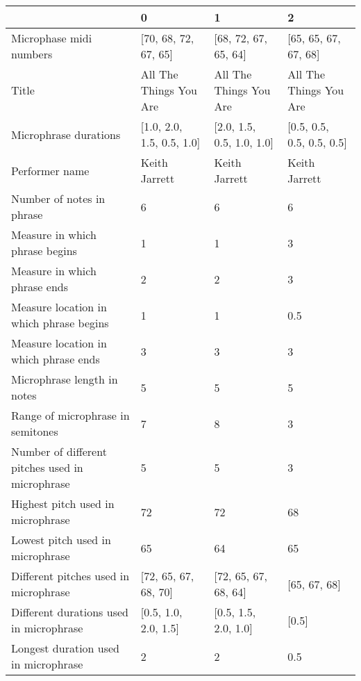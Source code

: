 \documentclass[11pt]{article}
\begin{document}
    \begin{tabular}{llll}
\toprule
{} &                                    0 &                                    1 &                                    2 \\
\midrule
Microphase midi numbers                                            &  [70, 68, 72, 67, 65] &  [68, 72, 67, 65, 64] &  [65, 65, 67, 67, 68] \\
Title                                                              &  All The Things You Are &  All The Things You Are &  All The Things You Are \\
Microphrase durations                                              &  [1.0, 2.0, 1.5, 0.5, 1.0] &  [2.0, 1.5, 0.5, 1.0, 1.0] &  [0.5, 0.5, 0.5, 0.5, 0.5] \\
Performer name                                                     &  Keith Jarrett &  Keith Jarrett &  Keith Jarrett \\
Number of notes in phrase                                          &  6 &  6 &  6 \\
Measure in which phrase begins                                     &  1 &  1 &  3 \\
Measure in which phrase ends                                       &  2 &  2 &  3 \\
Measure location in which phrase begins                            &  1 &  1 &  0.5 \\
Measure location in which phrase ends                              &  3 &  3 &  3 \\
Microphrase length in notes                                        &  5 &  5 &  5 \\
Range of microphrase in semitones                                  &  7 &  8 &  3 \\
Number of different pitches used in microphrase                    &  5 &  5 &  3 \\
Highest pitch used in microphrase                                  &  72 &  72 &  68 \\
Lowest pitch used in microphrase                                   &  65 &  64 &  65 \\
Different pitches used in microphrase                              &  [72, 65, 67, 68, 70] &  [72, 65, 67, 68, 64] &  [65, 67, 68] \\
Different durations used in microphrase                            &  [0.5, 1.0, 2.0, 1.5] &  [0.5, 1.5, 2.0, 1.0] &  [0.5] \\
Longest duration used in microphrase                               &  2 &  2 &  0.5 \\

\end{tabular}
\end{document}
